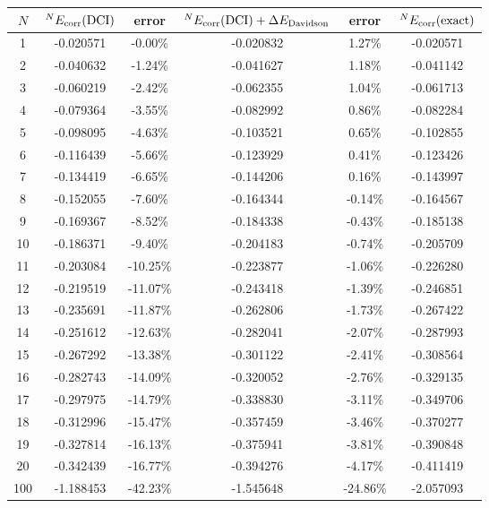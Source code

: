 \documentclass[a4paper]{book}
\newcommand{\corr}{{\rm corr}}
\begin{document}
\begin{solution}
\begin{itemize}
	\begin{minipage}{0.95\linewidth}
    \centering
    \captionsetup{type=table}
    \label{tab:correlation_energy_error}
    \begin{tabular}{c|c|c|c|c|c} \hline
		$N$		&	${}^N E_\corr( {\rm DCI} )$	&	error	& ${}^N E_\corr( {\rm DCI} ) + \Delta E_{\rm Davidson}$	& error	& ${}^N E_\corr( {\rm exact} )$ \\ \hline
  1 & -0.020571 &   -0.00\% &  -0.020832 &   1.27\% &   -0.020571 \\
  2 & -0.040632 &   -1.24\% &  -0.041627 &   1.18\% &   -0.041142 \\
  3 & -0.060219 &   -2.42\% &  -0.062355 &   1.04\% &   -0.061713 \\
  4 & -0.079364 &   -3.55\% &  -0.082992 &   0.86\% &   -0.082284 \\
  5 & -0.098095 &   -4.63\% &  -0.103521 &   0.65\% &   -0.102855 \\
  6 & -0.116439 &   -5.66\% &  -0.123929 &   0.41\% &   -0.123426 \\
  7 & -0.134419 &   -6.65\% &  -0.144206 &   0.16\% &   -0.143997 \\
  8 & -0.152055 &   -7.60\% &  -0.164344 &   -0.14\% &  -0.164567 \\
  9 & -0.169367 &   -8.52\% &  -0.184338 &   -0.43\% &  -0.185138 \\
 10 & -0.186371 &   -9.40\% &  -0.204183 &   -0.74\% &  -0.205709 \\
 11 & -0.203084 &   -10.25\% & -0.223877 &   -1.06\% &  -0.226280 \\
 12 & -0.219519 &   -11.07\% & -0.243418 &   -1.39\% &  -0.246851 \\
 13 & -0.235691 &   -11.87\% & -0.262806 &   -1.73\% &  -0.267422 \\
 14 & -0.251612 &   -12.63\% & -0.282041 &   -2.07\% &  -0.287993 \\
 15 & -0.267292 &   -13.38\% & -0.301122 &   -2.41\% &  -0.308564 \\
 16 & -0.282743 &   -14.09\% & -0.320052 &   -2.76\% &  -0.329135 \\
 17 & -0.297975 &   -14.79\% & -0.338830 &   -3.11\% &  -0.349706 \\
 18 & -0.312996 &   -15.47\% & -0.357459 &   -3.46\% &  -0.370277 \\
 19 & -0.327814 &   -16.13\% & -0.375941 &   -3.81\% &  -0.390848 \\
 20 & -0.342439 &   -16.77\% & -0.394276 &   -4.17\% &  -0.411419 \\ 
100 & -1.188453 &   -42.23\% & -1.545648 &   -24.86\% & -2.057093	\\ \hline
	\end{tabular}
	\end{minipage}
	
	\end{itemize}
	
	\end{solution}	
	
\end{document}
